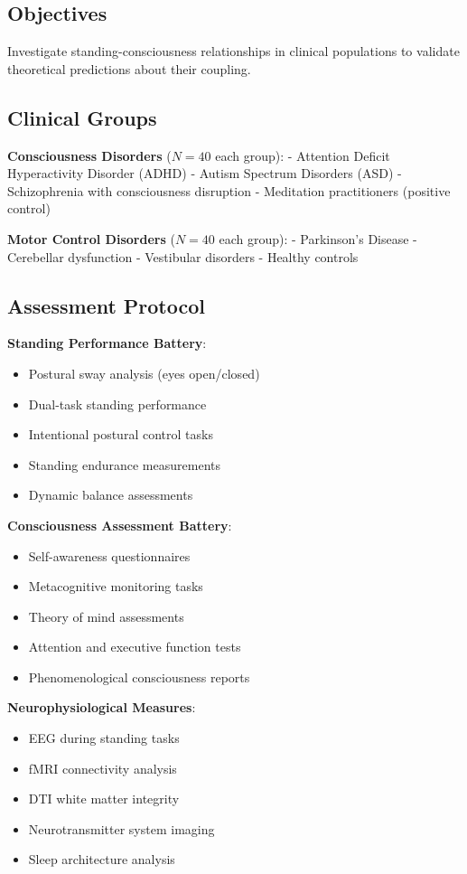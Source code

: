 \documentclass[12pt]{article}
\begin{document}
\subsection{Objectives}

Investigate standing-consciousness relationships in clinical populations to validate theoretical predictions about their coupling.

\subsection{Clinical Groups}

\textbf{Consciousness Disorders} ($N = 40$ each group):
- Attention Deficit Hyperactivity Disorder (ADHD)
- Autism Spectrum Disorders (ASD)  
- Schizophrenia with consciousness disruption
- Meditation practitioners (positive control)

\textbf{Motor Control Disorders} ($N = 40$ each group):
- Parkinson's Disease
- Cerebellar dysfunction
- Vestibular disorders
- Healthy controls

\subsection{Assessment Protocol}

\textbf{Standing Performance Battery}:
\begin{itemize}
\item Postural sway analysis (eyes open/closed)
\item Dual-task standing performance
\item Intentional postural control tasks
\item Standing endurance measurements
\item Dynamic balance assessments
\end{itemize}

\textbf{Consciousness Assessment Battery}:
\begin{itemize}
\item Self-awareness questionnaires
\item Metacognitive monitoring tasks
\item Theory of mind assessments
\item Attention and executive function tests
\item Phenomenological consciousness reports
\end{itemize}

\textbf{Neurophysiological Measures}:
\begin{itemize}
\item EEG during standing tasks
\item fMRI connectivity analysis
\item DTI white matter integrity
\item Neurotransmitter system imaging
\item Sleep architecture analysis
\end{itemize}
\end{document}
